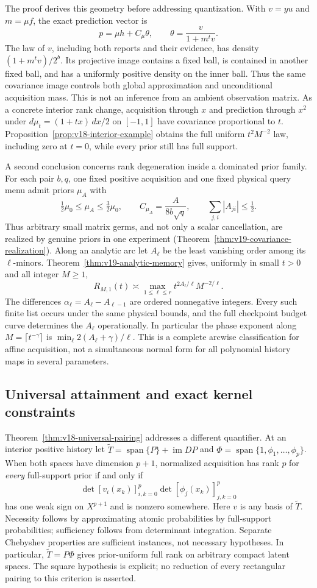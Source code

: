 The proof derives this geometry before addressing quantization. With
$v=yu$ and $m=\mu f$, the exact prediction vector is
\[
 p=\mu h+C_\mu\theta,\qquad
 \theta=\frac{v}{1+m^tv}.
\]
The law of $v$, including both reports and their evidence, has density
$(1+m^tv)/2^b$. Its projective image contains a fixed ball, is contained
in another fixed ball, and has a uniformly positive density on the
inner ball. Thus the same covariance image controls both global
approximation and unconditional acquisition mass. This is not an
inference from an ambient observation matrix. As a concrete interior
rank change, acquisition through $x$ and prediction through $x^2$ under
$d\mu_t=(1+tx)\,dx/2$ on $[-1,1]$ have covariance proportional to
$t$. Proposition~\ref{prop:v18-interior-example} obtains the full
uniform $t^2M^{-2}$ law, including zero at $t=0$, while every prior
still has full support.

A second conclusion concerns rank degeneration inside a dominated
prior family. For each pair $b,q$, one fixed positive acquisition and
one fixed physical query menu admit priors $\mu_A$ with
\[
 \tfrac12\mu_0\le\mu_A\le\tfrac32\mu_0,\qquad
 C_{\mu_A}=\frac{A}{8b\sqrt q},\qquad
 \sum_{j,i}|A_{ji}|\le\tfrac12.
\]
Thus arbitrary small matrix germs, and not only a scalar cancellation,
are realized by genuine priors in one experiment
(Theorem~\ref{thm:v19-covariance-realization}). Along an analytic
arc let $A_\ell$ be the least vanishing order among its $\ell$-minors.
Theorem~\ref{thm:v19-analytic-memory} gives, uniformly in small
$t>0$ and all integer $M\ge1$,
\[
 R_{M,1}(t)\asymp
     \max_{1\le\ell\le r}t^{2A_\ell/\ell}M^{-2/\ell}.
\]
The differences $\alpha_\ell=A_\ell-A_{\ell-1}$ are ordered
nonnegative integers. Every such finite list occurs under the same
physical bounds, and the full checkpoint budget curve determines the
$A_\ell$ operationally. In particular the phase exponent along
$M=\lceil t^{-\gamma}\rceil$ is
$\min_\ell 2(A_\ell+\gamma)/\ell$. This is a complete arcwise
classification for affine acquisition, not a simultaneous normal form
for all polynomial history maps in several parameters.

\subsection{Universal attainment and exact kernel constraints}
Theorem~\ref{thm:v18-universal-pairing} addresses a different
quantifier. At an interior positive history let
$\widetilde T=\operatorname{span}\{P\}+\operatorname{im}DP$ and
$\Phi=\operatorname{span}\{1,\phi_1,\ldots,\phi_p\}$. When both
spaces have dimension $p+1$, normalized acquisition has rank $p$ for
\emph{every} full-support prior if and only if
\[
 \det[v_i(x_k)]_{i,k=0}^p\det[\phi_j(x_k)]_{j,k=0}^p
\]
has one weak sign on $X^{p+1}$ and is nonzero somewhere. Here $v$ is
any basis of $\widetilde T$. Necessity follows by approximating atomic
probabilities by full-support probabilities; sufficiency follows from
determinant integration. Separate Chebyshev properties are sufficient
instances, not necessary hypotheses. In particular,
$\widetilde T=P\Phi$ gives prior-uniform full rank on arbitrary compact
latent spaces. The square hypothesis is explicit; no reduction of every
rectangular pairing to this criterion is asserted.


